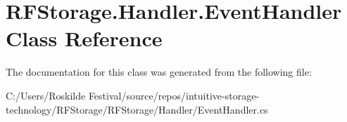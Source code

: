 \section{R\+F\+Storage.\+Handler.\+Event\+Handler Class Reference}
\label{class_r_f_storage_1_1_handler_1_1_event_handler}


The documentation for this class was generated from the following file\+:\begin{DoxyCompactItemize}
\item 
C\+:/\+Users/\+Roskilde Festival/source/repos/intuitive-\/storage-\/technology/\+R\+F\+Storage/\+R\+F\+Storage/\+Handler/Event\+Handler.\+cs\end{DoxyCompactItemize}
